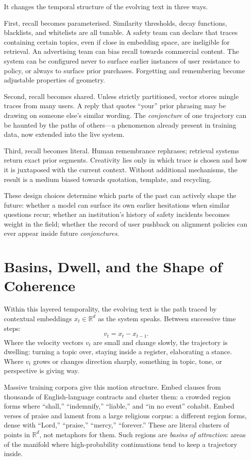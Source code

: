 \documentclass[12pt,a4paper]{article}
\begin{document}
It changes the temporal structure of the evolving text in three ways.

First, recall becomes parameterised. Similarity thresholds, decay functions, blacklists, and whitelists are all tunable. A safety team can declare that traces containing certain topics, even if close in embedding space, are ineligible for retrieval. An advertising team can bias recall towards commercial content. The system can be configured never to surface earlier instances of user resistance to policy, or always to surface prior purchases. Forgetting and remembering become adjustable properties of geometry.

Second, recall becomes shared. Unless strictly partitioned, vector stores mingle traces from many users. A reply that quotes ``your'' prior phrasing may be drawing on someone else's similar wording. The \emph{conjoncture} of one trajectory can be haunted by the paths of others---a phenomenon already present in training data, now extended into the live system.

Third, recall becomes literal. Human remembrance rephrases; retrieval systems return exact prior segments. Creativity lies only in which trace is chosen and how it is juxtaposed with the current context. Without additional mechanisms, the result is a medium biased towards quotation, template, and recycling.

These design choices determine which parts of the past can actively shape the future: whether a model can surface its own earlier hesitations when similar questions recur; whether an institution's history of safety incidents becomes weight in the field; whether the record of user pushback on alignment policies can ever appear inside future \emph{conjonctures}.

\section{Basins, Dwell, and the Shape of Coherence}

Within this layered temporality, the evolving text is the path traced by contextual embeddings $x_t \in \mathbb{R}^d$ as the system speaks. Between successive time steps:
\[
v_t = x_t - x_{t-1}.
\]
Where the velocity vectors $v_t$ are small and change slowly, the trajectory is dwelling: turning a topic over, staying inside a register, elaborating a stance. Where $v_t$ grows or changes direction sharply, something in topic, tone, or perspective is giving way.

Massive training corpora give this motion structure. Embed clauses from thousands of English-language contracts and cluster them: a crowded region forms where ``shall,'' ``indemnify,'' ``liable,'' and ``in no event'' cohabit. Embed verses of praise and lament from a large religious corpus: a different region forms, dense with ``Lord,'' ``praise,'' ``mercy,'' ``forever.'' These are literal clusters of points in $\mathbb{R}^d$, not metaphors for them. Such regions are \emph{basins of attraction}: areas of the manifold where high-probability continuations tend to keep a trajectory inside.
\end{document}
